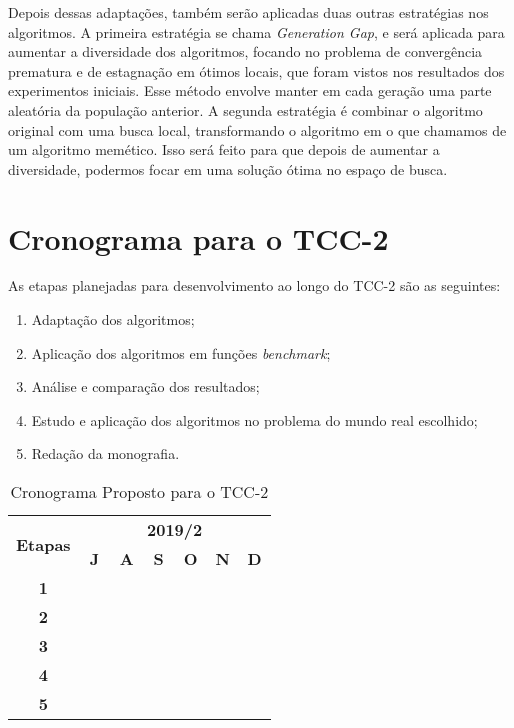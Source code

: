 Depois dessas adaptações, também serão aplicadas duas outras estratégias nos algoritmos. A primeira estratégia se chama \textit{Generation Gap}, e será aplicada para aumentar a diversidade dos algoritmos, focando no problema de convergência prematura e de estagnação em ótimos locais, que foram vistos nos resultados dos experimentos iniciais. Esse método envolve manter em cada geração uma parte aleatória da população anterior. A segunda estratégia é combinar o algoritmo original com uma busca local, transformando o algoritmo em o que chamamos de um algoritmo memético. Isso será feito para que depois de aumentar a diversidade, podermos focar em uma solução ótima no espaço de busca.

\section{Cronograma para o TCC-2}

As etapas planejadas para desenvolvimento ao longo do TCC-2 são as seguintes:

\begin{enumerate}
    \item Adaptação dos algoritmos;
    \item Aplicação dos algoritmos em funções \textit{benchmark};
    \item Análise e comparação dos resultados;
    \item Estudo e aplicação dos algoritmos no problema do mundo real escolhido;
    \item Redação da monografia.
\end{enumerate}

\begin{table}[h]
\centering
\begin{tabular}{|c||c|c|c|c|c|c|c|c|c|c|c|c|}
  \hline
  \multirow{2}{*}{\textbf{\small{Etapas}}} &
  \multicolumn{12}{|c|}{\textbf{\small{2019/2}}}\\
  \cline{2-13}
  & \multicolumn{2}{|c|}{\textbf{J}} & \multicolumn{2}{|c|}{\textbf{A}} & \multicolumn{2}{|c|}{\textbf{S}} & \multicolumn{2}{|c|}{\textbf{O}} & \multicolumn{2}{|c|}{\textbf{N}} & \multicolumn{2}{|c|}{\textbf{D}}  \\
  \hline \hline
 \textbf{\small{1}} & \rowcolor{black} &  &  &  & \rowcolor{white} & & & & & & & \\
  \hline
  \textbf{\small{2}} & &  &  & \rowcolor{black} & & \rowcolor{white} & & & & & & \\
  \hline
  \textbf{\small{3}} & &  &  &  & \rowcolor{black} & & & \rowcolor{white} & & & & \\
  \hline
  \textbf{\small{4}} & &  &  &  & &  & & \rowcolor{black} &  & & & \rowcolor{white} \\
  \hline
  \textbf{\small{5}} & \rowcolor{black} &  &  &  & & & & & & & & \rowcolor{white} \\
  \hline
\end{tabular}
\caption{Cronograma Proposto para o TCC-2}
\label{tab:cronograma}
\end{table}

